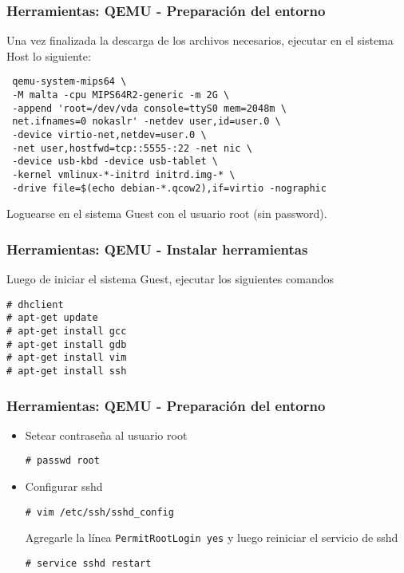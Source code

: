 \documentclass{beamer}
\begin{document}
\lstset{upquote=true}
\begin{frame}[fragile]
 \frametitle{Herramientas: QEMU - Preparación del entorno}
Una vez finalizada la descarga de los archivos necesarios, ejecutar en el sistema Host lo siguiente:

\begin{lstlisting}
 qemu-system-mips64 \
 -M malta -cpu MIPS64R2-generic -m 2G \
 -append 'root=/dev/vda console=ttyS0 mem=2048m \
 net.ifnames=0 nokaslr' -netdev user,id=user.0 \
 -device virtio-net,netdev=user.0 \
 -net user,hostfwd=tcp::5555-:22 -net nic \
 -device usb-kbd -device usb-tablet \
 -kernel vmlinux-*-initrd initrd.img-* \
 -drive file=$(echo debian-*.qcow2),if=virtio -nographic
\end{lstlisting}

Loguearse en el sistema Guest con el usuario root (sin password).
\end{frame}  


\begin{frame}[fragile]
 \frametitle{Herramientas: QEMU - Instalar herramientas}
Luego de iniciar el sistema Guest, ejecutar los siguientes comandos

 \begin{lstlisting}
# dhclient
# apt-get update
# apt-get install gcc
# apt-get install gdb
# apt-get install vim
# apt-get install ssh
 \end{lstlisting}

\end{frame} 

\begin{frame}[fragile]
 \frametitle{Herramientas: QEMU - Preparación del entorno} 
 \begin{itemize}
\item Setear contraseña al usuario root
\begin{lstlisting}
# passwd root
\end{lstlisting}

\item Configurar sshd
\begin{lstlisting}
# vim /etc/ssh/sshd_config
\end{lstlisting}

Agregarle la línea \texttt{PermitRootLogin yes} y luego reiniciar el servicio de sshd

\begin{lstlisting}
# service sshd restart
\end{lstlisting}
\end{itemize}
  \end{frame}
\end{document}
